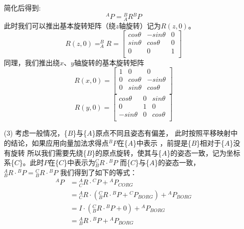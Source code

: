 \documentclass{seuthesis-2022}
\numberwithin{equation}{section}
\begin{document}
\begin{itemize}
  简化后得到:
  \begin{equation}
  ^{A}P = {^{B}_{A}R} {^{B}P}
  \end{equation}
  此时我们可以推出基本旋转矩阵（绕$z$轴旋转）记为$R(z,0)$。
  \begin{equation}
  R(z,0) = ^{B}_{A}R =
  \begin{bmatrix}
    cos\theta & -sin\theta & 0\\
    sin\theta & cos\theta & 0\\
    0 & 0 & 1\\
  \end{bmatrix}
\end{equation}
  同理，我们推出绕$x$、$y$轴旋转的基本旋转矩阵
  \begin{equation}
  R(x,0) =
  \begin{bmatrix}
    1 & 0 & 0\\
    0 & cos\theta & -sin\theta\\
    0 & sin\theta & cos\theta\\
  \end{bmatrix}
  \end{equation}
  \begin{equation}
  R(y,0) =
  \begin{bmatrix}
    cos\theta & 0 & sin\theta\\
    0 & 1 & 0\\
    -sin\theta & 0 & cos\theta\\
  \end{bmatrix}
  \end{equation}
  \item [(3)]
  考虑一般情况，\{$B$\}与\{$A$\}原点不同且姿态有偏差，
  此时按照平移映射中的结论，如果应用向量加法求得点$^{B}P$在\{$A$\}中表示 ，前提是\{$B$\}相对于\{$A$\}没有旋转
  所以我们需要先绕\{$B$\}的原点旋转，使其与\{$A$\}的姿态一致，记为坐标系\{$C$\}。此时$P$在\{$C$\}中表示为${^{C}_{B}R} \cdot {^{B}P}$
  而\{$C$\}与\{$A$\}的姿态一致，${^{A}_{B}R} \cdot {^{B}P} = {^{C}_{B}R} \cdot {^{B}P}$
  我们得到了如下的等式：
  \begin{equation}
  \begin{aligned}
    ^{A}P &= {^{A}_{C}R} \cdot {^{C}P} + {^{A}P_{CORG}}\\
          &= {^{A}_{C}R} \cdot ({^{C}_{B}R} \cdot {^{B}P} + {^{C}P_{BORG}}) + {^{A}P_{BORG}}\\
          &= I \cdot ({^{C}_{B}R} \cdot {^{B}P} + 0) + {^{A}P_{BORG}}\\
          &= {^{A}_{B}R} \cdot {^{B}P} + {^{A}P_{BORG}}\\

\end{aligned}
\end{equation}
\end{itemize}
\end{document}
